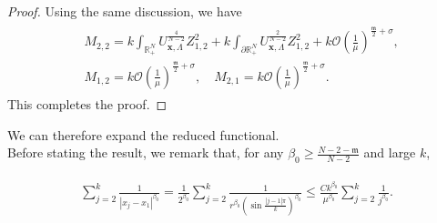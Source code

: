 \documentclass[11pt,a4paper]{amsart}
\begin{document}
\begin{proof}
Using the same discussion, we have
\begin{align*}
  \begin{aligned}
    &M_{2,2}= k \int_{\mathbb{R}_{+}^{N}} U_{\mathbf{x},\Lambda}^{\frac{4}{N-2}} Z_{1,2}^2 + k \int_{\partial\mathbb{R}_{+}^{N}} U_{\mathbf{x},\Lambda}^{\frac{2}{N-2}} Z_{1,2}^2 + k\mathcal O\left(\frac{1}{\mu}\right)^{\frac{\mathfrak m}{2}+\sigma},\\
    &M_{1,2} = k\mathcal O\left(\frac{1}{\mu}\right)^{\frac{\mathfrak m}{2}+\sigma}, \quad  M_{2,1} = k\mathcal O\left(\frac{1}{\mu}\right)^{\frac{\mathfrak m}{2}+\sigma}.
  \end{aligned}
\end{align*}
This completes the proof.%
\end{proof}
We can therefore expand the reduced functional. \\ Before stating the result, we remark that,
 for any $\beta_{0} \geq \frac{N-2-\mathfrak m}{N-2}$ and large $k$,
  
  \begin{align*}
    \begin{aligned}
      \sum_{j=2}^k \frac{1}{\left|x_{j}-x_{1}\right|^{\beta_{0}}}  =\frac{1}{2^{\beta_0}} \sum_{j=2}^k \frac{1}{r^{\beta_0}\left(\sin \frac{|j-1|\pi}{k}\right)^{\beta_0}} \leq \frac{C k^{\beta_{0}}}{\mu^{\beta_{0}}} \sum_{j=2}^k \frac{1}{j^{\beta_{0}}}.
    \end{aligned}
  \end{align*}
  
\end{document}
